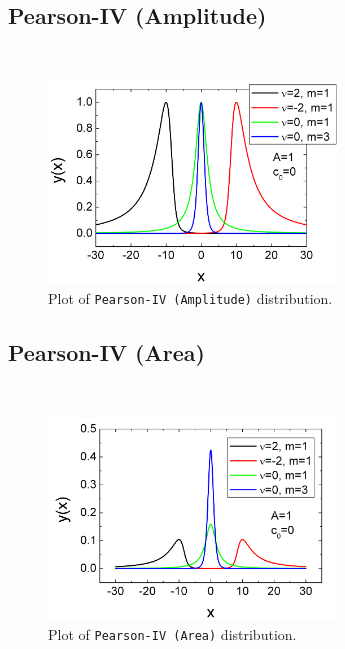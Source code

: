 \subsection{Pearson-IV (Amplitude)} ~\\
\label{sec:PearsonIVAmplitude}
\begin{figure}[htb]
\begin{center}
\includegraphics[width=0.6824\textwidth]{PearsonIVAmplitude.png}
\end{center}
\caption{Plot of \texttt{Pearson-IV (Amplitude)} distribution.}
\label{fig:PearsonIVAmplitude}
\end{figure}
\clearpage
\subsection{Pearson-IV (Area)} ~\\
\label{sec:PearsonIVArea}
\begin{figure}[htb]
\begin{center}
\includegraphics[width=0.6824\textwidth]{PearsonIVArea.png}
\end{center}
\caption{Plot of \texttt{Pearson-IV (Area)} distribution.}
\label{fig:PearsonIVArea}
\end{figure}
\clearpage

